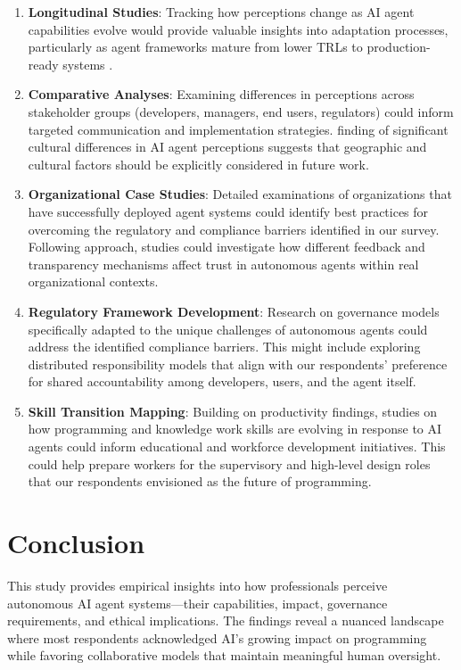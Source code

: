\documentclass{article}
\begin{document}
\begin{enumerate}
\def\labelenumi{\arabic{enumi}.}
\item
  \textbf{Longitudinal Studies}: Tracking how perceptions change as AI
  agent capabilities evolve would provide valuable insights into
  adaptation processes, particularly as agent frameworks mature from
  lower TRLs to production-ready systems \cite{Wrona2023}.
\item
  \textbf{Comparative Analyses}: Examining differences in perceptions
  across stakeholder groups (developers, managers, end users,
  regulators) could inform targeted communication and implementation
  strategies. \cite{LiuCHI2024} finding of significant cultural
  differences in AI agent perceptions suggests that geographic and
  cultural factors should be explicitly considered in future work.
\item
  \textbf{Organizational Case Studies}: Detailed examinations of
  organizations that have successfully deployed agent systems could
  identify best practices for overcoming the regulatory and compliance
  barriers identified in our survey. Following \cite{Brown2025}
  approach, studies could investigate how different feedback and
  transparency mechanisms affect trust in autonomous agents within real
  organizational contexts.
\item
  \textbf{Regulatory Framework Development}: Research on governance
  models specifically adapted to the unique challenges of autonomous
  agents could address the identified compliance barriers. This might
  include exploring distributed responsibility models that align with
  our respondents' preference for shared accountability among
  developers, users, and the agent itself.
\item
  \textbf{Skill Transition Mapping}: Building on \cite{NoyZhang2023}
  productivity findings, studies on how programming and knowledge work
  skills are evolving in response to AI agents could inform educational
  and workforce development initiatives. This could help prepare workers
  for the supervisory and high-level design roles that our respondents
  envisioned as the future of programming.
\end{enumerate}

\section{Conclusion}\label{conclusion}

This study provides empirical insights into how professionals perceive
autonomous AI agent systems---their capabilities, impact, governance
requirements, and ethical implications. The findings reveal a nuanced
landscape where most respondents acknowledged AI's growing impact on
programming while favoring collaborative models that maintain meaningful
human oversight.
\end{document}

